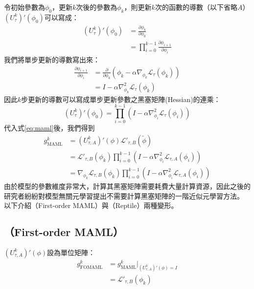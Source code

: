 令初始參數為$\phi_{0}$，更新$k$次後的參數為$\phi_{k}$，則更新$k$次的函數的導數（以下省略$A$）$\left( U_{\tau}^{k} \right)' \left(\phi_{0}\right)$可以寫成：
\begin{align}
    \left( U_{\tau}^{k} \right)' \left(\phi_{0}\right) &= \frac{\partial \phi_{k}}{\partial \phi_{0}} \\
                                                       &= \prod\limits_{i=0}^{k-1} \frac{\partial \phi_{i+1}}{\partial \phi_{i}} 
\end{align}
我們將單步更新的導數寫出來：
\begin{align}
    \frac{\partial \phi_{i+1}}{\partial \phi_{i}} &= \frac{\partial}{\partial \phi_{k}} \left( \phi_{k} - \alpha \nabla_{\phi_{k}} \mathcal{L}_{\tau} \left( \phi_{k} \right) \right) \\
                                                  &= I - \alpha \nabla^{2}_{\phi_{k}} \mathcal{L}_{\tau} \left( \phi_{k} \right)
\end{align}
因此$k$步更新的導數可以寫成單步更新參數之黑塞矩陣(Hessian)的連乘：
\begin{equation}
    \left( U_{\tau}^{k} \right)' \left(\phi_{0}\right) = \prod\limits_{i=0}^{k-1}  \left( I - \alpha \nabla^{2}_{\phi_{i}} \mathcal{L}_{\tau} \left( \phi_{i} \right) \right)
\end{equation}
代入式\ref{eq:maml}後，我們得到
\begin{align}
    g_{\mathrm{MAML}}^{k} &= \left(U_{\tau, A}^{k}\right)' (\phi) \mathcal{L'}_{\tau, B} ( \widetilde{\phi} ) \\
                      &= \mathcal{L'}_{\tau, B} ( \phi_{k} ) \prod\limits_{i=0}^{k-1}  \left( I - \alpha \nabla^{2}_{\phi_{i}} \mathcal{L}_{\tau, A} \left( \phi_{i} \right) \right) \\
                      &= \nabla_{\phi_{k}} \mathcal{L}_{\tau, B} ( \phi_{k} ) \prod\limits_{i=0}^{k-1}  \left( I - \alpha \nabla^{2}_{\phi_{i}} \mathcal{L}_{\tau, A} \left( \phi_{i} \right) \right)
\end{align}
由於模型的參數維度非常大，計算其黑塞矩陣需要耗費大量計算資源，因此之後的研究者紛紛對模型無關元學習提出不需要計算黑塞矩陣的一階近似元學習方法。
以下介紹\fomaml（First-order MAML）與\reptile （Reptile）\cite{nichol2018first}兩種變形。
\subsection{\fomaml （First-order MAML）}
$\left(U_{\tau, A}^{k}\right)' (\phi)$設為單位矩陣：
\begin{align}
    g_{\mathrm{FOMAML}}^{k} &= g_{\mathrm{MAML}}^{k}\bigg|_{\left(U_{\tau, A}^{k}\right)' (\phi) = I} \\
    &= \mathcal{L'}_{\tau, B} (\phi_{k} )
\end{align}
